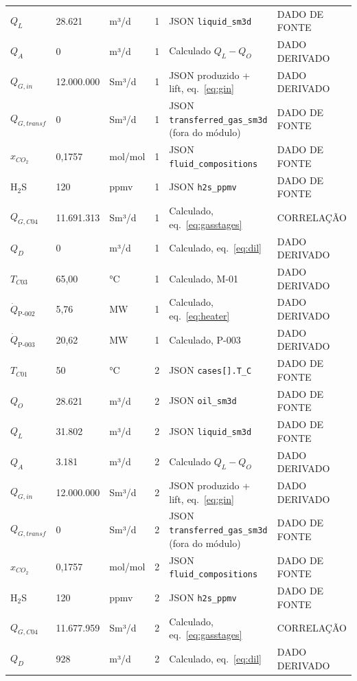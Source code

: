 \documentclass[11pt,a4paper]{article}
\numberwithin{equation}{section}
\numberwithin{table}{section}
\numberwithin{figure}{section}
\newcommand{\tipo}[1]{\textsf{\footnotesize #1}}
\begin{document}
{\begin{longtable}{L{3.6cm}L{2.2cm}lL{1.0cm}L{4.2cm}l}
$Q_{L}$ & 28.621 & m³/d & 1 & JSON \texttt{liquid\_sm3d} & \tipo{DADO DE FONTE}\\
$Q_{A}$ & 0 & m³/d & 1 & Calculado $Q_L-Q_O$ & \tipo{DADO DERIVADO}\\
$Q_{G,in}$ & 12.000.000 & Sm³/d & 1 & JSON produzido + lift, eq.~\eqref{eq:gin} & \tipo{DADO DERIVADO}\\
$Q_{G,transf}$ & 0 & Sm³/d & 1 & JSON \texttt{transferred\_gas\_sm3d} (fora do módulo) & \tipo{DADO DE FONTE}\\
$x_{CO_2}$ & 0{,}1757 & mol/mol & 1 & JSON \texttt{fluid\_compositions} & \tipo{DADO DE FONTE}\\
H$_2$S & 120 & ppmv & 1 & JSON \texttt{h2s\_ppmv} & \tipo{DADO DE FONTE}\\
$Q_{G,C04}$ & 11.691.313 & Sm³/d & 1 & Calculado, eq.~\eqref{eq:gasstages} & \tipo{CORRELAÇÃO}\\
$Q_{D}$ & 0 & m³/d & 1 & Calculado, eq.~\eqref{eq:dil} & \tipo{DADO DERIVADO}\\
$T_{C03}$ & 65,00 & °C & 1 & Calculado, M-01 & \tipo{DADO DERIVADO}\\
$\dot Q_{\mbox{P-002}}$ & 5,76 & MW & 1 & Calculado, eq.~\eqref{eq:heater} & \tipo{DADO DERIVADO}\\
$\dot Q_{\mbox{P-003}}$ & 20,62 & MW & 1 & Calculado, P-003 & \tipo{DADO DERIVADO}\\
$T_{C01}$ & 50 & °C & 2 & JSON \texttt{cases[].T\_C} & \tipo{DADO DE FONTE}\\
$Q_{O}$ & 28.621 & m³/d & 2 & JSON \texttt{oil\_sm3d} & \tipo{DADO DE FONTE}\\
$Q_{L}$ & 31.802 & m³/d & 2 & JSON \texttt{liquid\_sm3d} & \tipo{DADO DE FONTE}\\
$Q_{A}$ & 3.181 & m³/d & 2 & Calculado $Q_L-Q_O$ & \tipo{DADO DERIVADO}\\
$Q_{G,in}$ & 12.000.000 & Sm³/d & 2 & JSON produzido + lift, eq.~\eqref{eq:gin} & \tipo{DADO DERIVADO}\\
$Q_{G,transf}$ & 0 & Sm³/d & 2 & JSON \texttt{transferred\_gas\_sm3d} (fora do módulo) & \tipo{DADO DE FONTE}\\
$x_{CO_2}$ & 0{,}1757 & mol/mol & 2 & JSON \texttt{fluid\_compositions} & \tipo{DADO DE FONTE}\\
H$_2$S & 120 & ppmv & 2 & JSON \texttt{h2s\_ppmv} & \tipo{DADO DE FONTE}\\
$Q_{G,C04}$ & 11.677.959 & Sm³/d & 2 & Calculado, eq.~\eqref{eq:gasstages} & \tipo{CORRELAÇÃO}\\
$Q_{D}$ & 928 & m³/d & 2 & Calculado, eq.~\eqref{eq:dil} & \tipo{DADO DERIVADO}\\

\end{longtable}}
\end{document}
